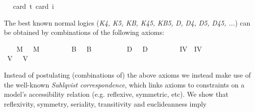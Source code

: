 \begin{isabellebody}
\ \ \isamarkupfalse%
{\isacharbrackleft}card\ {\isacharprime}t{\isacharequal}{}{\isacharcomma}\ card\ i{\isacharequal}{}{\isacharbrackright}%
\ %
%
\isamarkupfalse%
\ %
%
%
%
%
\isamarkuptrue%
%
\begin{isamarkuptext}%
The best known normal logics (\emph{K4, K5, KB, K45, KB5, D, D4, D5, D45, ...}) can be obtained by
 combinations of the following axioms:%
\end{isamarkuptext}\isamarkuptrue%
\ \ \isamarkupfalse%
\ M\ \ \ {\isachardoublequoteopen}M\ {\isasymequiv}\ \isactrlbold {\isasymforall}{\isasymphi}{\isachardot}\ \isactrlbold {\isasymbox}{\isasymphi}\ \isactrlbold {\isasymrightarrow}\ {\isasymphi}{\isachardoublequoteclose}\isanewline
\ \ \isamarkupfalse%
\ B\ \ \ {\isachardoublequoteopen}B\ {\isasymequiv}\ \isactrlbold {\isasymforall}{\isasymphi}{\isachardot}\ {\isasymphi}\ \isactrlbold {\isasymrightarrow}\ \ \isactrlbold {\isasymbox}\isactrlbold {\isasymdiamond}{\isasymphi}{\isachardoublequoteclose}\isanewline
\ \ \isamarkupfalse%
\ D\ \ \ {\isachardoublequoteopen}D\ {\isasymequiv}\ \isactrlbold {\isasymforall}{\isasymphi}{\isachardot}\ \isactrlbold {\isasymbox}{\isasymphi}\ \isactrlbold {\isasymrightarrow}\ \isactrlbold {\isasymdiamond}{\isasymphi}{\isachardoublequoteclose}\isanewline
\ \ \isamarkupfalse%
\ IV\ \ {\isachardoublequoteopen}IV\ {\isasymequiv}\ \isactrlbold {\isasymforall}{\isasymphi}{\isachardot}\ \isactrlbold {\isasymbox}{\isasymphi}\ \isactrlbold {\isasymrightarrow}\ \ \isactrlbold {\isasymbox}\isactrlbold {\isasymbox}{\isasymphi}{\isachardoublequoteclose}\isanewline
\ \ \isamarkupfalse%
\ V\ \ \ {\isachardoublequoteopen}V\ {\isasymequiv}\ \isactrlbold {\isasymforall}{\isasymphi}{\isachardot}\ \isactrlbold {\isasymdiamond}{\isasymphi}\ \isactrlbold {\isasymrightarrow}\ \isactrlbold {\isasymbox}\isactrlbold {\isasymdiamond}{\isasymphi}{\isachardoublequoteclose}%
\begin{isamarkuptext}%
Instead of postulating (combinations of) the above  axioms we instead make use of 
  the well-known \emph{Sahlqvist correspondence}, which links axioms to constraints on a model's accessibility
  relation (e.g. reflexive, symmetric, etc). We show  that  reflexivity, symmetry, seriality, transitivity and euclideanness imply

\end{isamarkuptext}
\end{isabellebody}
